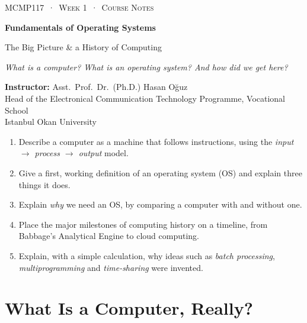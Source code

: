 \documentclass[11pt,a4paper]{article}
\begin{document}
\thispagestyle{empty}
\begin{tcolorbox}[enhanced,colback=dark,colframe=dark,arc=0pt,boxrule=0pt,
  left=18pt,right=18pt,top=20pt,bottom=20pt,coltext=white]
{\small\color{mint}\textsc{MCMP117 \,·\, Week 1 \,·\, Course Notes}}\par\medskip
{\headfont\fontsize{26}{30}\selectfont\bfseries Fundamentals of Operating Systems}\par\medskip
{\large The Big Picture \& a History of Computing}\par\smallskip
{\small\itshape\color{white!70} What is a computer? What is an operating system? And how did we get here?}
\end{tcolorbox}

\vspace{0.4em}
{\small
\textbf{Instructor:} Asst.\ Prof.\ Dr.\ (Ph.D.) Hasan Oğuz\\
Head of the Electronical Communication Technology Programme, Vocational School\\
Istanbul Okan University\par}

\vspace{0.8em}
\begin{keyidea}
\begin{enumerate}[leftmargin=1.4em]
  \item Describe a computer as a machine that follows instructions, using the \emph{input $\to$ process $\to$ output} model.
  \item Give a first, working definition of an operating system (OS) and explain three things it does.
  \item Explain \emph{why} we need an OS, by comparing a computer with and without one.
  \item Place the major milestones of computing history on a timeline, from Babbage's Analytical Engine to cloud computing.
  \item Explain, with a simple calculation, why ideas such as \emph{batch processing}, \emph{multiprogramming} and \emph{time-sharing} were invented.
\end{enumerate}
\end{keyidea}

\setcounter{tocdepth}{2}
\tableofcontents

\section{What Is a Computer, Really?}
\end{document}
